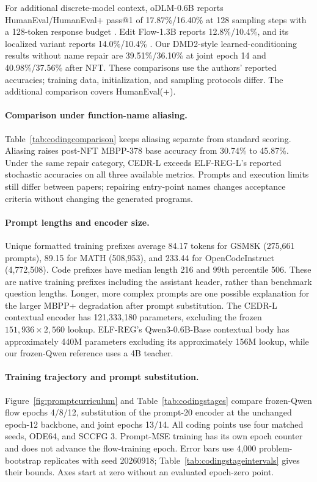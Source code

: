 \documentclass[11pt,letterpaper]{article}
\begin{document}
For additional discrete-model context, oDLM-0.6B reports HumanEval/HumanEval+ pass@1 of 17.87\%/16.40\% at 128 sampling steps with a 128-token response budget \citep[Table 1 and Appendix B.7]{odlm}. Edit Flow-1.3B reports 12.8\%/10.4\%, and its localized variant reports 14.0\%/10.4\% \citep[Table 3]{editflow}. Our DMD2-style learned-conditioning results without name repair are 39.51\%/36.10\% at joint epoch 14 and 40.98\%/37.56\% after NFT. These comparisons use the authors' reported accuracies; training data, initialization, and sampling protocols differ. The additional comparison covers HumanEval(+).

\paragraph{Comparison under function-name aliasing.}
Table~\ref{tab:codingcomparison} keeps aliasing separate from standard scoring. Aliasing raises post-NFT MBPP-378 base accuracy from 30.74\% to 45.87\%. Under the same repair category, CEDR-L exceeds ELF-REG-L's reported stochastic accuracies on all three available metrics. Prompts and execution limits still differ between papers; repairing entry-point names changes acceptance criteria without changing the generated programs.

\paragraph{Prompt lengths and encoder size.}
Unique formatted training prefixes average 84.17 tokens for GSM8K (275,661 prompts), 89.15 for MATH (508,953), and 233.44 for OpenCodeInstruct (4,772,508). Code prefixes have median length 216 and 99th percentile 506. These are native training prefixes including the assistant header, rather than benchmark question lengths. Longer, more complex prompts are one possible explanation for the larger MBPP+ degradation after prompt substitution. The CEDR-L contextual encoder has 121,333,180 parameters, excluding the frozen $151{,}936\times2{,}560$ lookup. ELF-REG's Qwen3-0.6B-Base contextual body has approximately 440M parameters excluding its approximately 156M lookup, while our frozen-Qwen reference uses a 4B teacher.

\paragraph{Training trajectory and prompt substitution.}
Figure~\ref{fig:promptcurriculum} and Table~\ref{tab:codingstages} compare frozen-Qwen flow epochs 4/8/12, substitution of the prompt-20 encoder at the unchanged epoch-12 backbone, and joint epochs 13/14. All coding points use four matched seeds, ODE64, and SCCFG 3. Prompt-MSE training has its own epoch counter and does not advance the flow-training epoch. Error bars use 4,000 problem-bootstrap replicates with seed 20260918; Table~\ref{tab:codingstageintervals} gives their bounds. Axes start at zero without an evaluated epoch-zero point.
\end{document}
